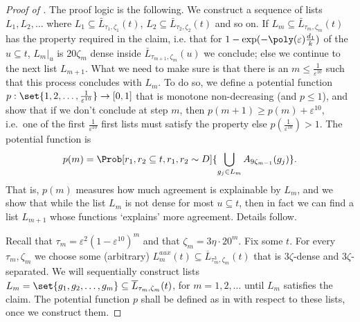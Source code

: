 \begin{proof}[Proof of ]
    The proof logic is the following. We construct a sequence of lists \(L_1,L_2,\dots\) where \(L_1 \subseteq \bar{L}_{\tau_1,\zeta_1}(t)\), \(L_2 \subseteq \bar{L}_{\tau_2,\zeta_2}(t)\) and so on. If \(L_m \subseteq \bar{L}_{\tau_m,\zeta_m}(t)\) has the property required in the claim, i.e. that for \(1-\exp(-\poly(\varepsilon) \frac{d_1}{k})\) of the \(u \subseteq t\), \(L_m |_u\) is \(20\zeta_m\) dense inside \(\bar{L}_{\tau_{m+1},\zeta_m}(u)\) we conclude; else we continue to the next list \(L_{m+1}\). What we need to make sure is that there is an \(m \leq \frac{1}{\varepsilon^{10}}\) such that this process concludes with \(L_m\). To do so, we define a potential function \(p:\set{1,2,\dots, \frac{1}{\varepsilon^{10}}} \to [0,1]\) that is monotone non-decreasing (and \(p \leq 1\)), and show that if we don't conclude at step \(m\), then \(p(m+1) \geq p(m) + \varepsilon^{10}\), i.e.\ one of the first \(\frac{1}{\varepsilon^{10}}\) first lists must satisfy the property else \(p(\frac{1}{\varepsilon^{10}}) > 1\). The potential function is 
    \begin{equation} \label{eq:potential-function}
        p(m) = \Prob[r_1,r_2 \subseteq t, r_1,r_2 \sim D]{\bigcup_{g_j \in L_m} A_{9\zeta_{m-1}}(g_j)}.
    \end{equation}
    That is, \(p(m)\) measures how much agreement is explainable by \(L_m\), and we show that while the list \(L_m\) is not dense for most \(u \subseteq t\), then in fact we can find a list \(L_{m+1}\) whose functions `explains' more agreement. Details follow.
    
    Recall that \(\tau_m = \varepsilon^2 (1-\varepsilon^{10})^m\) and that \(\zeta_m = 3\eta \cdot 20^m\). Fix some \(t\). For every \(\tau_m,\zeta_m\) we choose some (arbitrary) \(L^{aux}_{m}(t) \subseteq \overline{L}_{\tau_{m}^3,\zeta_m}(t)\) that is \(3\zeta\)-dense and \(3\zeta\)-separated. We will sequentially construct lists \(L_m=\set{g_1,g_2,\dots,g_m} \subseteq \overline{L}_{\tau_{m},\zeta_{m}}(t)\), for \(m=1,2,\dots\) until \(L_m\) satisfies the claim. The potential function \(p\) shall be defined as in  with respect to these lists, once we construct them. %


\end{proof}
